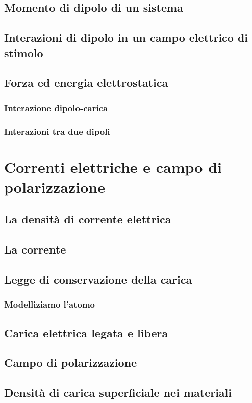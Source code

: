 \documentclass{book}
\begin{document}
\section{Momento di dipolo di un sistema}
\section{Interazioni di dipolo in un campo elettrico di stimolo}
\section{Forza ed energia elettrostatica}
\subsection{Interazione dipolo-carica}
\subsection{Interazioni tra due dipoli}

\chapter{Correnti elettriche e campo di polarizzazione}
\section{La densit\`a di corrente elettrica}
\section{La corrente}
\section{Legge di conservazione della carica}
\subsection{Modelliziamo l'atomo}
\section{Carica elettrica legata e libera}
\section{Campo di polarizzazione}
\section{Densit\`a di carica superficiale nei materiali}
\end{document}

